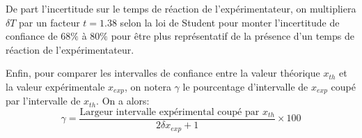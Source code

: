 \documentclass[12pt]{article}
\begin{document}
De part l'incertitude sur le temps de réaction de l'expérimentateur, on multipliera $\delta T$ par un facteur $t = 1.38$ selon la loi de Student pour monter
l'incertitude de confiance de $68\%$ à $80\%$ pour être plus représentatif de la présence d'un temps de réaction de l'expérimentateur.

Enfin, pour comparer les intervalles de confiance entre la valeur théorique $x_{th}$ et la valeur expérimentale $x_{exp}$, on notera $\gamma$ le pourcentage
d'intervalle de $x_{exp}$ coupé par l'intervalle de $x_{th}$. On a alors:
\begin{equation}
    \gamma = \frac{\text{Largeur intervalle expérimental coupé par }x_{th}}{2\delta x_{exp} + 1} \times 100
\end{equation}
\end{document}
